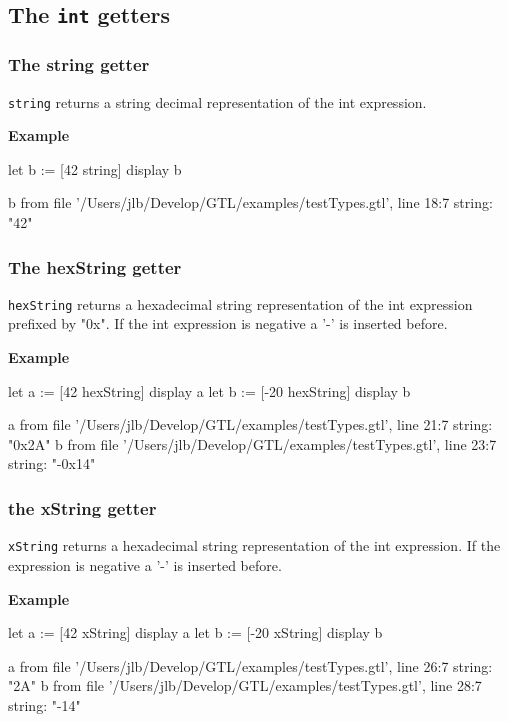\documentclass[10pt,openright,twosides,final]{memoir}
\newcommand{\gtltype}[1]{{\small\ttfamily #1}}
\newcommand{\ccst}[1]{{\footnotesize\ttfamily\colorbox{light-blue}{'#1'}}}
\newcommand{\scst}[1]{{\footnotesize\ttfamily\colorbox{light-blue}{"#1"}}}
\newcommand{\gtlinline}[1]{\colorbox{light-blue}{\lstinline[language=gtl]{#1}}}
\newcommand{\example}{\vspace{.75em}\noindent\textbf{Example}\vspace{0em}}
\begin{document}
\subsection{The \texttt{int} getters}

\subsubsection{The {\bfseries\ttfamily string} getter}

\gtlinline{string} returns a string decimal representation of the \gtltype{int} expression. 

\example
\begin{gtl}
let b := [42 string]
display b
\end{gtl}
\begin{console}
b from file '/Users/jlb/Develop/GTL/examples/testTypes.gtl', line 18:7
    string: "42"
\end{console}


\subsubsection{The {\bfseries\ttfamily hexString} getter}

\gtlinline{hexString} returns a hexadecimal string representation of the int expression prefixed by \scst{0x}. If the int expression is negative a \ccst{-} is inserted before.

\example
\begin{gtl}
let a := [42 hexString]
display a
let b := [-20 hexString]
display b
\end{gtl}
\begin{console}
a from file '/Users/jlb/Develop/GTL/examples/testTypes.gtl', line 21:7
    string: "0x2A"
b from file '/Users/jlb/Develop/GTL/examples/testTypes.gtl', line 23:7
    string: "-0x14"
\end{console}

\subsubsection{the {\bfseries\ttfamily xString} getter}

\gtlinline{xString} returns a hexadecimal string representation of the int expression. If the expression is negative a \ccst{-} is inserted before.

\example
\begin{gtl}
let a := [42 xString]
display a
let b := [-20 xString]
display b
\end{gtl}
\begin{console}
a from file '/Users/jlb/Develop/GTL/examples/testTypes.gtl', line 26:7
    string: "2A"
b from file '/Users/jlb/Develop/GTL/examples/testTypes.gtl', line 28:7
    string: "-14"
\end{console}
\end{document}
